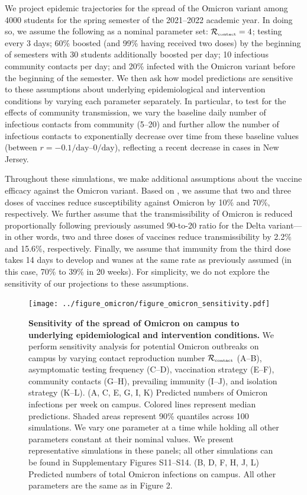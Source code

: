 \documentclass[12pt]{article}
\newcommand{\Rx}[1]{\ensuremath{{\mathcal R}_{#1}}}
\newcommand{\Rc}{\Rx{\textrm{\tiny{contact}}}}
\begin{document}
We project epidemic trajectories for the spread of the Omicron variant among 4000 students for the spring semester of the 2021--2022 academic year.
In doing so, we assume the following as a nominal parameter set: $\Rc = 4$; testing every 3 days; 60\% boosted (and 99\% having received two doses) by the beginning of semesters with 30 students additionally boosted per day; 10 infectious community contacts per day; and 20\% infected with the Omicron variant before the beginning of the semester.
We then ask how model predictions are sensitive to these assumptions about underlying epidemiological and intervention conditions by varying each parameter separately.
In particular, to test for the effects of community transmission, we vary the baseline daily number of infectious contacts from community (5--20) and further allow the number of infectious contacts to exponentially decrease over time from these baseline values (between $r=-0.1/\textrm{day}$--$0/\textrm{day}$), reflecting a recent decrease in cases in New Jersey.

Throughout these simulations, we make additional assumptions about the vaccine efficacy against the Omicron variant.
Based on \cite{ferguson2021report}, we assume that two and three doses of vaccines reduce susceptibility against Omicron by 10\% and 70\%, respectively.
We further assume that the transmissibility of Omicron is reduced proportionally following previously assumed 90-to-20 ratio for the Delta variant---in other words, two and three doses of vaccines reduce transmissibility by 2.2\% and 15.6\%, respectively.
Finally, we assume that immunity from the third dose takes 14 days to develop and wanes at the same rate as previously assumed (in this case, 70\% to 39\% in 20 weeks).
For simplicity, we do not explore the sensitivity of our projections to these assumptions.

\begin{figure}[!ht]
\texttt{[image: ../figure\_omicron/figure\_omicron\_sensitivity.pdf]}
\caption{
\textbf{Sensitivity of the spread of Omicron on campus to underlying epidemiological and intervention conditions.}
We perform sensitivity analysis for potential Omicron outbreaks on campus by varying contact reproduction number $\Rc$ (A--B), asymptomatic testing frequency (C--D), vaccination strategy (E--F), community contacts (G--H), prevailing immunity (I--J), and isolation strategy (K--L).
(A, C, E, G, I, K) Predicted numbers of Omicron infections per week on campus. 
Colored lines represent median predictions.
Shaded areas represent 90\% quantiles across 100 simulations.
We vary one parameter at a time while holding all other parameters constant at their nominal values.
We present representative simulations in these panels; all other simulations can be found in Supplementary Figures S11--S14.
(B, D, F, H, J, L) Predicted numbers of total Omicron infections on campus.
All other parameters are the same as in Figure 2.
\label{fig:sensitivity}
}
\end{figure}
\end{document}
